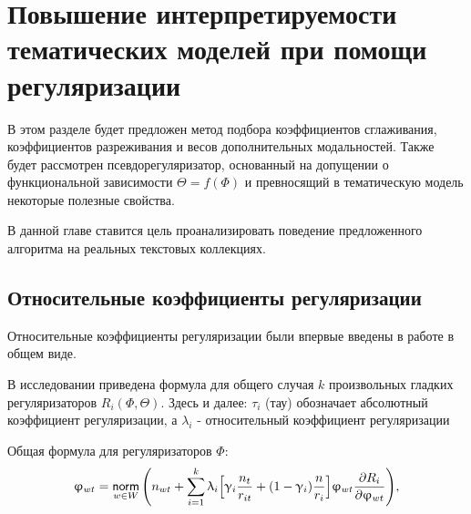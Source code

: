 \chapter{Повышение интерпретируемости тематических моделей при помощи регуляризации}

В этом разделе будет предложен метод подбора коэффициентов сглаживания, коэффициентов разреживания и весов дополнительных модальностей. Также будет рассмотрен псевдорегуляризатор, основанный на допущении о функциональной зависимости $\Theta = f(\Phi)$ и превносящий в тематическую модель некоторые полезные свойства.

В данной главе ставится цель проанализировать поведение предложенного алгоритма на реальных текстовых коллекциях.

\section{Относительные коэффициенты регуляризации}



Относительные коэффициенты регуляризации были впервые введены в работе \cite{doykov} в общем виде.

В исследовании \cite{doykov} приведена формула для общего случая $k$ произвольных гладких регуляризаторов $R_i(\Phi, \Theta)$. Здесь и далее: $\tau_i$ (тау) обозначает абсолютный коэффициент регуляризации, а $\lambda_i$ - относительный коэффициент регуляризации

Общая формула для регуляризаторов $\Phi$:
\[
\upvarphi_{wt} = \mathop{\mathsf{norm}}\limits_{w \in W}\Bigg( 
    n_{wt} + \sum_{i=1}^k \uplambda_i \Big[
        \upgamma_i \frac{n_t}{r_{it}} + (1-\upgamma_i)\frac{n}{r_i}
        \Big] 
    \upvarphi_{wt} \frac{\partial R_i}{\partial \upvarphi_{wt}}
\Bigg), \label{rel_phi_general}
\]

